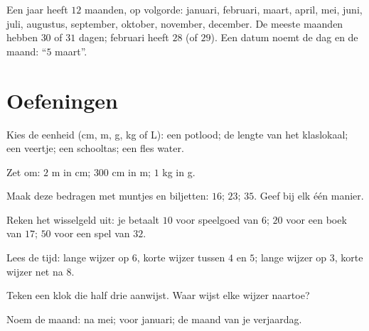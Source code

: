 \begin{example}[De kalender]\label{ex:g2:measure:calendar}
Een jaar heeft $12$ maanden, op volgorde: januari, februari, maart,
april, mei, juni, juli, augustus, september, oktober, november,
december. De meeste maanden hebben $30$ of $31$ dagen; februari heeft
$28$ (of $29$). Een datum noemt de dag en de maand: ``$5$ maart''.
\end{example}

\section{Oefeningen}

\begin{exercise}[$\star$]\label{exo:g2:measure:1}
Kies de eenheid (cm, m, g, kg of L): een potlood; de lengte van het
klaslokaal; een veertje; een schooltas; een fles water.
\end{exercise}

\begin{exercise}[$\star$]\label{exo:g2:measure:2}
Zet om: $2$ m in cm; $300$ cm in m; $1$ kg in g.
\end{exercise}

\begin{exercise}[$\star$]\label{exo:g2:measure:3}
Maak deze bedragen met muntjes en biljetten: $16$; \quad $23$; \quad
$35$. Geef bij elk één manier.
\end{exercise}

\begin{exercise}[$\star$]\label{exo:g2:measure:4}
Reken het wisselgeld uit: je betaalt $10$ voor speelgoed van $6$; $20$
voor een boek van $17$; $50$ voor een spel van $32$.
\end{exercise}

\begin{exercise}[$\star$]\label{exo:g2:measure:5}
Lees de tijd: lange wijzer op $6$, korte wijzer tussen $4$ en $5$;
lange wijzer op $3$, korte wijzer net na $8$.
\end{exercise}

\begin{exercise}[$\star$]\label{exo:g2:measure:6}
Teken een klok die half drie aanwijst. Waar wijst elke wijzer naartoe?
\end{exercise}

\begin{exercise}[$\star$]\label{exo:g2:measure:7}
Noem de maand: na mei; voor januari; de maand van je verjaardag.
\end{exercise}

